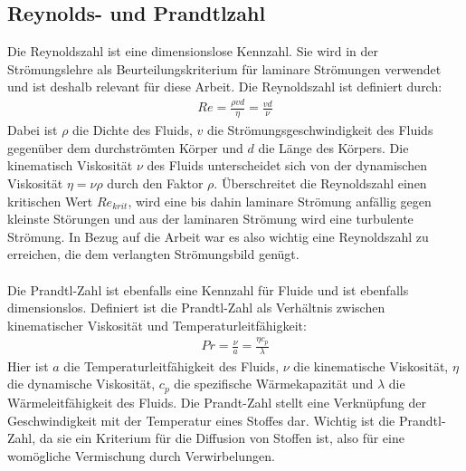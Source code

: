 \subsection{Reynolds- und Prandtlzahl}
Die Reynoldszahl ist eine dimensionslose Kennzahl. Sie wird in der Str\"{o}mungslehre als Beurteilungskriterium f\"{u}r laminare Str\"{o}mungen verwendet und ist deshalb relevant f\"{u}r diese Arbeit. Die Reynoldszahl ist definiert durch:
\begin{align*}
{Re} = \frac{\rho vd}{\eta} = \frac{vd}{\nu}
\end{align*}
Dabei ist \(\rho\) die Dichte des Fluids, \(v\) die Str\"{o}mungsgeschwindigkeit des Fluids gegen\"{u}ber dem durchstr\"{o}mten K\"{o}rper und \(d\) die L\"{a}nge des K\"{o}rpers. Die kinematisch Viskosit\"{a}t \(\nu\) des Fluids unterscheidet sich von der dynamischen Viskosit\"{a}t \(\eta = \nu \rho\) durch den Faktor \(\rho\). \"{U}berschreitet die Reynoldszahl einen kritischen Wert \({Re}_{krit}\), wird eine bis dahin laminare Str\"{o}mung anf\"{a}llig gegen kleinste St\"{o}rungen und aus der laminaren Str\"{o}mung wird eine turbulente Str\"{o}mung. In Bezug auf die Arbeit war es also wichtig eine Reynoldszahl zu erreichen, die dem verlangten Str\"{o}mungsbild gen\"{u}gt.
\\\\
Die Prandtl-Zahl ist ebenfalls eine Kennzahl f\"{u}r Fluide und ist ebenfalls dimensionslos. Definiert ist die Prandtl-Zahl als Verh\"{a}ltnis zwischen kinematischer Viskosit\"{a}t und Temperaturleitf\"{a}higkeit:
\begin{align*}
{Pr} = \frac{\nu}{a} = \frac{\eta c_p}{\lambda}
\end{align*}
Hier ist \(a\) die Temperaturleitf\"{a}higkeit des Fluids, \(\nu\) die kinematische Viskosit\"{a}t, \(\eta\) die dynamische Viskosit\"{a}t, \(c_p\) die spezifische W\"{a}rmekapazit\"{a}t und \(\lambda\) die W\"{a}rmeleitf\"{a}higkeit des Fluids. Die Prandt-Zahl stellt eine Verkn\"{u}pfung der Geschwindigkeit mit der Temperatur eines Stoffes dar. Wichtig ist die Prandtl-Zahl, da sie ein Kriterium f\"{u}r die Diffusion von Stoffen ist, also f\"{u}r eine wom\"{o}gliche Vermischung durch Verwirbelungen.